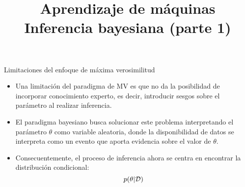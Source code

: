 \documentclass[9pt]{beamer}
\title{\textbf{Aprendizaje de máquinas} \\ Inferencia bayesiana (parte 1)}
\begin{document}
\begin{frame}
  \titlepage
\end{frame}

\begin{frame}{Limitaciones del enfoque de máxima verosimilitud}

\begin{itemize}
	\item Una limitación del paradigma de MV es que no da la posibilidad de incorporar conocimiento experto, es decir, introducir sesgos sobre el parámetro al realizar inferencia.\pause
	\item El paradigma bayesiano busca solucionar este problema interpretando el parámetro $\theta$ como variable aleatoria, donde la disponibilidad de datos se interpreta como un evento que aporta evidencia sobre el valor de $\theta$.\pause
	\item Consecuentemente, el proceso de inferencia ahora se centra en encontrar la distribución condicional:
	\begin{equation*}
		p(\theta|{\mathcal D})
	\end{equation*}
\end{itemize}

\end{frame}
\end{document}
